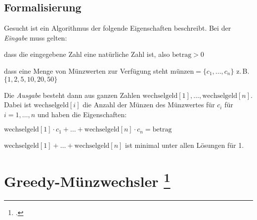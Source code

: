 \documentclass{lehramt-informatik-haupt}
\begin{document}
\subsection{Formalisierung}

Gesucht ist ein Algorithmus der folgende Eigenschaften beschreibt.
Bei der \emph{Eingabe} muss gelten:

\bigskip

\begin{compactenum}
\item dass die eingegebene Zahl eine natürliche Zahl ist, also
$\text{betrag} > 0$

\item dass eine Menge von Münzwerten zur Verfügung steht $
\text{münzen}=\{c_1,...,c_n\}$ z.\,B. $\{1,2,5,10,20,50\}$
\end{compactenum}

\bigskip

\noindent
Die \emph{Ausgabe} besteht dann aus ganzen Zahlen
$\text{wechselgeld}[1], \ldots ,\text{wechselgeld}[n]$.
Dabei ist $\text{wechselgeld}[i] $ die Anzahl der Münzen
des Münzwertes für $ c_i $ für $ i=1,\ldots,n $ und haben die
Eigenschaften:

\bigskip

\begin{compactenum}
\item $\text{wechselgeld}[1] \cdot c_1 + \ldots +
\text{wechselgeld}[n] \cdot c_n = \text{betrag}$

\item $\text{wechselgeld}[1] + \ldots + \text{wechselgeld}[n] $
ist minimal unter allen Lösungen für 1.
\end{compactenum}

%

\begin{antwort}
\end{antwort}

%

\section{Greedy-Münzwechsler
\footcite[Seite 1, Aufgabe 1: Greedy-Münzwechsler]{aud:ab:3}}
\end{document}
